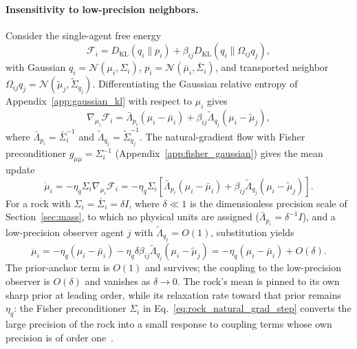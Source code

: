 \paragraph{Insensitivity to low-precision neighbors.} Consider the single-agent free energy
\begin{equation}
\mathcal{F}_i = D_{\mathrm{KL}}(q_i \| p_i) + \beta_{ij} D_{\mathrm{KL}}(q_i \| \Omega_{ij} q_j),
\end{equation}
with Gaussian $q_i = \mathcal{N}(\mu_i, \Sigma_i)$, $p_i = \mathcal{N}(\bar{\mu}_i, \bar{\Sigma}_i)$, and transported neighbor $\Omega_{ij} q_j = \mathcal{N}(\tilde{\mu}_j, \tilde{\Sigma}_{q_j})$. Differentiating the Gaussian relative entropy of Appendix~\ref{app:gaussian_kl} with respect to $\mu_i$ gives
\begin{equation}
\nabla_{\mu_i}\mathcal{F}_i = \bar{\Lambda}_{p_i}(\mu_i - \bar{\mu}_i) + \beta_{ij}\tilde{\Lambda}_{q_j}(\mu_i - \tilde{\mu}_j),
\label{eq:rock_grad_mu}
\end{equation}
where $\bar{\Lambda}_{p_i} = \bar{\Sigma}_i^{-1}$ and $\tilde{\Lambda}_{q_j} = \tilde{\Sigma}_{q_j}^{-1}$. The natural-gradient flow with Fisher preconditioner $g_{\mu\mu} = \Sigma_i^{-1}$ (Appendix~\ref{app:fisher_gaussian}) gives the mean update
\begin{equation}
\dot{\mu}_i = -\eta_q \Sigma_i \nabla_{\mu_i}\mathcal{F}_i = -\eta_q\Sigma_i\left[\bar{\Lambda}_{p_i}(\mu_i - \bar{\mu}_i) + \beta_{ij}\tilde{\Lambda}_{q_j}(\mu_i - \tilde{\mu}_j)\right].
\label{eq:rock_natural_grad_step}
\end{equation}
For a rock with $\Sigma_i = \bar{\Sigma}_i = \delta I$, where $\delta \ll 1$ is the dimensionless precision scale of Section~\ref{sec:mass}, to which no physical units are assigned ($\bar{\Lambda}_{p_i} = \delta^{-1} I$), and a low-precision observer agent $j$ with $\tilde{\Lambda}_{q_j} = O(1)$, substitution yields
\begin{equation}
\dot{\mu}_i = -\eta_q(\mu_i - \bar{\mu}_i) - \eta_q \delta \beta_{ij} \tilde{\Lambda}_{q_j} (\mu_i - \tilde{\mu}_j) = -\eta_q(\mu_i - \bar{\mu}_i) + O(\delta).
\label{eq:rock_inertia}
\end{equation}
The prior-anchor term is $O(1)$ and survives; the coupling to the low-precision observer is $O(\delta)$ and vanishes as $\delta \to 0$. The rock's mean is pinned to its own sharp prior at leading order, while its relaxation rate toward that prior remains $\eta_q$: the Fisher preconditioner $\Sigma_i$ in Eq.~\eqref{eq:rock_natural_grad_step} converts the large precision of the rock into a small response to coupling terms whose own precision is of order one~\cite{Amari2016}.

